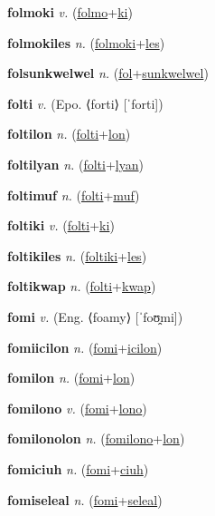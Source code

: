 \textbf{\hypertarget{folmoki}{folmoki}} \textit{v.} (\hyperlink{folmo}{folmo}+\allowbreak \hyperlink{ki}{ki})


\textbf{\hypertarget{folmokiles}{folmokiles}} \textit{n.} (\hyperlink{folmoki}{folmoki}+\allowbreak \hyperlink{les}{les})


\textbf{\hypertarget{folsunkwelwel}{folsunkwelwel}} \textit{n.} (\hyperlink{fol}{fol}+\allowbreak \hyperlink{sunkwelwel}{sunkwelwel})


\textbf{\hypertarget{folti}{folti}} \textit{v.} (Epo. ⟨forti⟩ [ˈforti])


\textbf{\hypertarget{foltilon}{foltilon}} \textit{n.} (\hyperlink{folti}{folti}+\allowbreak \hyperlink{lon}{lon})


\textbf{\hypertarget{foltilyan}{foltilyan}} \textit{n.} (\hyperlink{folti}{folti}+\allowbreak \hyperlink{lyan}{lyan})


\textbf{\hypertarget{foltimuf}{foltimuf}} \textit{n.} (\hyperlink{folti}{folti}+\allowbreak \hyperlink{muf}{muf})


\textbf{\hypertarget{foltiki}{foltiki}} \textit{v.} (\hyperlink{folti}{folti}+\allowbreak \hyperlink{ki}{ki})


\textbf{\hypertarget{foltikiles}{foltikiles}} \textit{n.} (\hyperlink{foltiki}{foltiki}+\allowbreak \hyperlink{les}{les})


\textbf{\hypertarget{foltikwap}{foltikwap}} \textit{n.} (\hyperlink{folti}{folti}+\allowbreak \hyperlink{kwap}{kwap})


\textbf{\hypertarget{fomi}{fomi}} \textit{v.} (Eng. ⟨foamy⟩ [ˈfoʊ̯mi])


\textbf{\hypertarget{fomiicilon}{fomiicilon}} \textit{n.} (\hyperlink{fomi}{fomi}+\allowbreak \hyperlink{icilon}{icilon})


\textbf{\hypertarget{fomilon}{fomilon}} \textit{n.} (\hyperlink{fomi}{fomi}+\allowbreak \hyperlink{lon}{lon})


\textbf{\hypertarget{fomilono}{fomilono}} \textit{v.} (\hyperlink{fomi}{fomi}+\allowbreak \hyperlink{lono}{lono})


\textbf{\hypertarget{fomilonolon}{fomilonolon}} \textit{n.} (\hyperlink{fomilono}{fomilono}+\allowbreak \hyperlink{lon}{lon})


\textbf{\hypertarget{fomiciuh}{fomiciuh}} \textit{n.} (\hyperlink{fomi}{fomi}+\allowbreak \hyperlink{ciuh}{ciuh})


\textbf{\hypertarget{fomiseleal}{fomiseleal}} \textit{n.} (\hyperlink{fomi}{fomi}+\allowbreak \hyperlink{seleal}{seleal})


